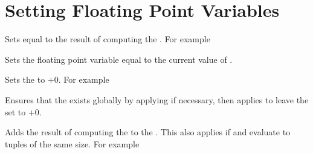 \documentclass[oneside]{book}
\begin{document}
\section{Setting Floating Point Variables}

\begin{function}{\FpSet}
\begin{syntax}
  
\end{syntax}
Sets  equal to the result of computing the
. For example
\begin{demohigh}
\FpSet {}
\FpUse \lTmpaFp
\end{demohigh}
\end{function}

\begin{function}{\FpSetEq}
\begin{syntax}
  
\end{syntax}
Sets the floating point variable  equal to the current
value of .
\end{function}

\begin{function}{\FpZero}
\begin{syntax}
 
\end{syntax}
Sets the  to $+0$. For example
\begin{demohigh}
\FpSet {}
\FpZero \lTmpaFp
\FpUse \lTmpaFp
\end{demohigh}
\end{function}

\begin{function}{\FpZeroNew}
\begin{syntax}
 
\end{syntax}
Ensures that the  exists globally
by applying  if necessary, then applies
 to leave the  set to $+0$.
\end{function}

\begin{function}{\FpAdd}
\begin{syntax}
  
\end{syntax}
Adds the result of computing the  to
the .
This also applies if  and  evaluate to tuples of the same size. For example
\begin{demohigh}
\FpSet {}
\FpAdd {}
\FpUse \lTmpaFp
\end{demohigh}
\end{function}
\end{document}
